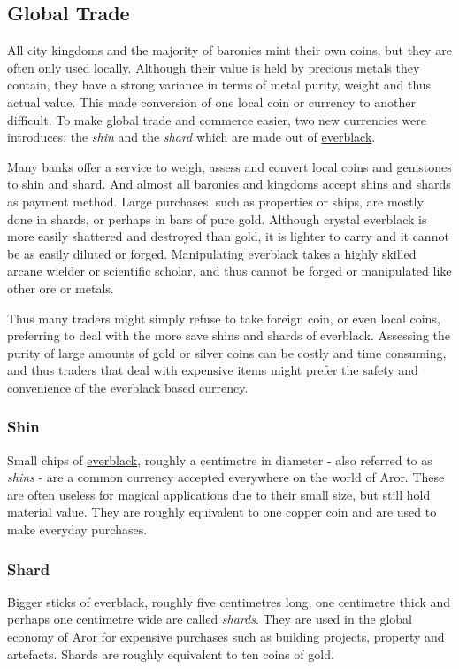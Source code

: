 \subsection{Global Trade}
\label{sec:Trade}

All city kingdoms and the majority of baronies mint their own coins, but they
are often only used locally. Although their value is held by precious metals
they contain, they have a strong variance in terms of metal purity, weight and
thus actual value. This made conversion of one local coin or currency to
another difficult. To make global trade and commerce easier, two new
currencies were introduces: the \emph{shin} and the \emph{shard} which are
made out of \hyperref[sec:Everblack]{everblack}.

Many banks offer a service to weigh, assess and convert local coins and
gemstones to shin and shard. And almost all baronies and kingdoms accept shins
and shards as payment method. Large purchases, such as properties or ships, are
mostly done in shards, or perhaps in bars of pure gold. Although crystal
everblack is more easily shattered and destroyed than gold, it is lighter
to carry and it cannot be as easily diluted or forged. Manipulating everblack
takes a highly skilled arcane wielder or scientific scholar, and thus cannot
be forged or manipulated like other ore or metals.

Thus many traders might simply refuse to take foreign coin, or even local
coins, preferring to deal with the more save shins and shards of everblack.
Assessing the purity of large amounts of gold or silver coins can be costly
and time consuming, and thus traders that deal with expensive items might
prefer the safety and convenience of the everblack based currency.

\subsubsection{Shin}
\label{sec:Shin}

Small chips of \hyperref[sec:Everblack]{everblack}, roughly a centimetre in
diameter - also referred to as \emph{shins} - are a common currency accepted
everywhere on the world of Aror. These are often useless for magical
applications due to their small size, but still hold material value. They are
roughly equivalent to one copper coin and are used to make everyday purchases.

\subsubsection{Shard}
\label{sec:Shard}

Bigger sticks of everblack, roughly five centimetres long, one centimetre thick
and perhaps one centimetre wide are called \emph{shards}. They are used in the
global economy of Aror for expensive purchases such as building projects,
property and artefacts. Shards are roughly equivalent to ten coins of gold.
